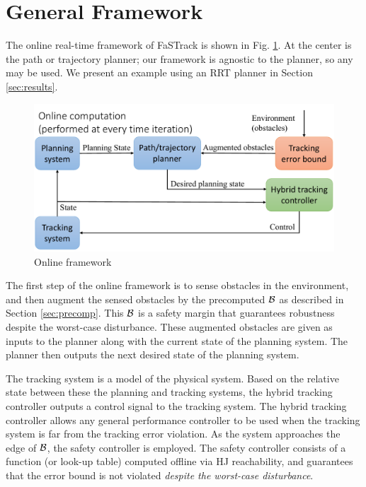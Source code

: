 \section{General Framework \label{sec:framework}}
The online real-time framework of FaSTrack is shown in Fig. \ref{fig:fw_online}. At the center is the path or trajectory planner; our framework is agnostic to the planner, so any may be used. We present an example using an RRT planner in Section \ref{sec:results}.
\begin{figure}[]
  \centering
	\includegraphics[width=0.9\columnwidth]{fig/framework_online}
	\caption{Online framework}
	\label{fig:fw_online}
	\vspace{-.1in}
\end{figure}

The first step of the online framework is to sense obstacles in the environment, and then augment the sensed obstacles by the precomputed $\mathcal B$ as described in Section \ref{sec:precomp}. This $\mathcal B$ is a safety margin that guarantees robustness despite the worst-case disturbance. These augmented obstacles are given as inputs to the planner along with the current state of the planning system. The planner then outputs the next desired state of the planning system. 

The tracking system is a model of the physical system. Based on the relative state between these the planning and tracking systems, the hybrid tracking controller outputs a control signal to the tracking system. The hybrid tracking controller allows any general performance controller to be used when the tracking system is far from the tracking error violation. As the system approaches the edge of $\mathcal B$, the safety controller is employed. The safety controller consists of a function (or look-up table) computed offline via HJ reachability, and guarantees that the error bound is not violated \textit{despite the worst-case disturbance}.

